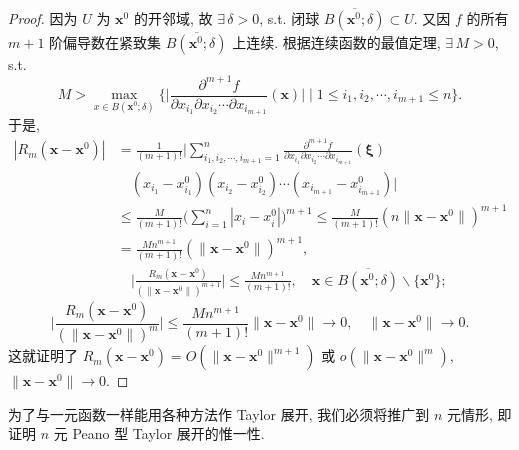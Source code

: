 \begin{proof}
因为 $U$ 为 $\boldsymbol{x}^{0}$ 的开邻域, 故 $\exists\, \delta > 0$, s.t. 闭球 $\overline{B(\boldsymbol{x}^{0}; \delta)} \subset U$. 又因 $f$ 的所有 $m + 1$ 阶偏导数在紧致集 $\overline{B(\boldsymbol{x}^{0}; \delta)}$ 上连续. 根据连续函数的最值定理, $\exists\, M > 0$, s.t.
\[
  M > \max_{x \in B(\boldsymbol{x}^{0}; \delta)}\Big\{\Big|\frac{\partial^{m+1}f}{\partial x_{i_{1}}\partial x_{i_{2}}\cdots\partial x_{i_{m+1}}}(\boldsymbol{x})\Big| \;\Big|\; 1 \leqslant i_{1}, i_{2}, \cdots, i_{m+1} \leqslant n\Big\}.
\]
于是,
\begin{align*}
  |R_{m}(\boldsymbol{x} - \boldsymbol{x}^{0})| &= \frac{1}{(m + 1)!}\Big|\sum_{i_{1}, i_{2}, \cdots, i_{m+1}=1}^{n}\frac{\partial^{m+1}f}{\partial x_{i_{1}}\partial x_{i_{2}}\cdots\partial x_{i_{m+1}}}(\boldsymbol{\xi}) \\
  &\quad (x_{i_{1}} - x_{i_{1}}^{0})(x_{i_{2}} - x_{i_{2}}^{0})\cdots(x_{i_{m+1}} - x_{i_{m+1}}^{0})\Big| \\
  &\leqslant \frac{M}{(m + 1)!}\Big(\sum_{i=1}^{n}|x_{i} - x_{i}^{0}|\Big)^{m+1} \leqslant \frac{M}{(m + 1)!}(n\|\boldsymbol{x} - \boldsymbol{x}^{0}\|)^{m+1} \\
  &= \frac{Mn^{m+1}}{(m + 1)!}(\|\boldsymbol{x} - \boldsymbol{x}^{0}\|)^{m+1}, \\
  &\quad \Big|\frac{R_{m}(\boldsymbol{x} - \boldsymbol{x}^{0})}{(\|\boldsymbol{x} - \boldsymbol{x}^{0}\|)^{m+1}}\Big| \leqslant \frac{Mn^{m+1}}{(m + 1)!}, \quad \boldsymbol{x} \in \overline{B(\boldsymbol{x}^{0}; \delta)} \backslash \{\boldsymbol{x}^{0}\};
\end{align*}
\[
  \Big|\frac{R_{m}(\boldsymbol{x} - \boldsymbol{x}^{0})}{(\|\boldsymbol{x} - \boldsymbol{x}^{0}\|)^{m}}\Big| \leqslant \frac{Mn^{m+1}}{(m + 1)!}\|\boldsymbol{x} - \boldsymbol{x}^{0}\| \to 0, \quad \|\boldsymbol{x} - \boldsymbol{x}^{0}\| \to 0.
\]
这就证明了 $R_{m}(\boldsymbol{x} - \boldsymbol{x}^{0}) = O(\|\boldsymbol{x} - \boldsymbol{x}^{0}\|^{m+1})$ 或 $o(\|\boldsymbol{x} - \boldsymbol{x}^{0}\|^{m})$, $\|\boldsymbol{x} - \boldsymbol{x}^{0}\| \to 0$.
\end{proof}

为了与一元函数一样能用各种方法作 Taylor 展开, 我们必须将推广到 $n$ 元情形, 即证明 $n$ 元 Peano 型 Taylor 展开的惟一性.

